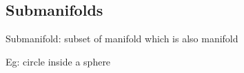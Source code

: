 
\subsection{Submanifolds}

Submanifold: subset of manifold which is also manifold

Eg: circle inside a sphere



